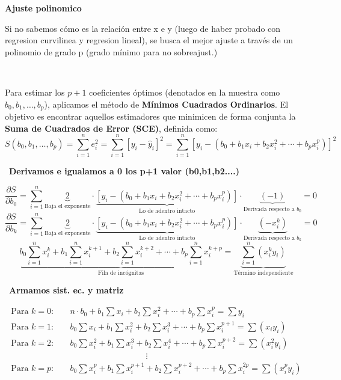 \documentclass[12pt,a4paper]{article}
\newcommand{\paso}[1]{\tikz[baseline=(n.base)]{\node[draw, dashed, circle, inner sep=1.2pt, font=\footnotesize\bfseries] (n) {#1};}}
\begin{document}
\begin{center}
{\fontsize{17}{21}\selectfont\bfseries Ajuste polinomico}
\end{center}

Si no sabemos cómo es la relación entre x e y (luego de haber probado con regresion curvilinea y regresion lineal), se busca el mejor ajuste a través de un polinomio de grado p (grado mínimo para no sobreajust.)

\paso{1} \
\begin{minipage}[t]{0.94\linewidth}
\vspace{-16pt}
Para estimar los $p+1$ coeficientes óptimos (denotados en la muestra como $b_0, b_1, \ldots, b_p$), aplicamos el método de \textbf{Mínimos Cuadrados Ordinarios}. El objetivo es encontrar aquellos estimadores que minimicen de forma conjunta la \textbf{Suma de Cuadrados de Error (SCE)}, definida como:
\[
S(b_0,b_1,\ldots,b_p) = \sum_{i=1}^{n} e_i^2 = \sum_{i=1}^{n} [y_i-\hat{y}_i]^2 = \sum_{i=1}^{n} \left[ y_i - (b_0+b_1 x_i + b_2 x_i^2 + \cdots + b_p x_i^p) \right]^2
\]
\end{minipage}

\paso{2} \ \textbf{Derivamos e igualamos a 0 los p+1 valor (b0,b1,b2....)}

\[
\frac{\partial S}{\partial b_0} = \sum_{i=1}^{n} \underbrace{2}_{\text{Baja el exponente}} \cdot \underbrace{\left[y_i - (b_0+b_1 x_i+b_2 x_i^2+\cdots+b_p x_i^p)\right]}_{\text{Lo de adentro intacto}} \cdot \underbrace{(-1)}_{\text{Derivada respecto a } b_0} = 0
\]
\[
\frac{\partial S}{\partial b_k} = \sum_{i=1}^{n} \underbrace{2}_{\text{Baja el exponente}} \cdot \underbrace{\left[y_i - (b_0+b_1 x_i+b_2 x_i^2+\cdots+b_p x_i^p)\right]}_{\text{Lo de adentro intacto}} \cdot \underbrace{(-x_i^k)}_{\text{Derivada respecto a } b_k} = 0
\]
\[
\underbrace{b_0\sum_{i=1}^{n} x_i^k + b_1\sum_{i=1}^{n} x_i^{k+1} + b_2\sum_{i=1}^{n} x_i^{k+2} + \cdots + b_p\sum_{i=1}^{n} x_i^{k+p}}_{\text{Fila de incógnitas}} = \underbrace{\sum_{i=1}^{n}(x_i^k y_i)}_{\text{Término independiente}}
\]

\paso{3} \ \textbf{Armamos sist. ec. y matriz}

\begin{align*}
\text{Para } k=0: &\quad n\cdot b_0 + b_1\sum x_i + b_2\sum x_i^2 + \cdots + b_p\sum x_i^p = \sum y_i \\
\text{Para } k=1: &\quad b_0\sum x_i + b_1\sum x_i^2 + b_2\sum x_i^3 + \cdots + b_p\sum x_i^{p+1} = \sum (x_i y_i) \\
\text{Para } k=2: &\quad b_0\sum x_i^2 + b_1\sum x_i^3 + b_2\sum x_i^4 + \cdots + b_p\sum x_i^{p+2} = \sum (x_i^2 y_i) \\
&\qquad\qquad\qquad\qquad\qquad \vdots \\
\text{Para } k=p: &\quad b_0\sum x_i^p + b_1\sum x_i^{p+1} + b_2\sum x_i^{p+2} + \cdots + b_p\sum x_i^{2p} = \sum (x_i^p y_i)
\end{align*}
\end{document}
